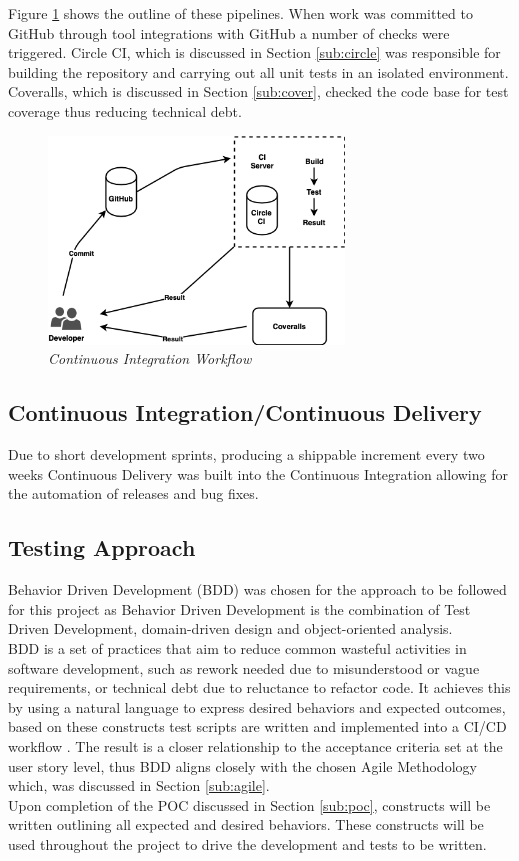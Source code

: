 Figure \ref{img:ci} shows the outline of these pipelines. When work was committed to GitHub through tool integrations with GitHub a number of checks were triggered. Circle CI, which is discussed in Section \ref{sub:circle} was responsible for building the repository and carrying out all unit tests in an isolated environment. Coveralls, which is discussed in Section \ref{sub:cover}, checked the code base for test coverage thus reducing technical debt.
\begin{figure}[!ht]
\centering
\includegraphics*[width=0.7\textwidth]{images/ci-cd.png}
\caption{\em Continuous Integration Workflow}
\label{img:ci}
\end{figure}

\subsection{Continuous Integration/Continuous Delivery}
Due to short development sprints, producing a shippable increment every two weeks Continuous Delivery was built into the Continuous Integration allowing for the automation of releases and bug fixes.

\subsection{Testing Approach}
Behavior Driven Development (BDD) was chosen for the approach to be followed for this project as Behavior Driven Development is the combination of Test Driven Development, domain-driven design and object-oriented analysis. 
\\BDD is a set of practices that aim to reduce common wasteful activities in software development, such as rework needed due to misunderstood or vague requirements, or technical debt due to reluctance to refactor code. It achieves this by using a natural language to express desired behaviors and expected outcomes, based on these constructs test scripts are written and implemented into a CI/CD workflow \citep{solis_wang}. The result is a closer relationship to the acceptance criteria set at the user story level, thus BDD aligns closely with the chosen Agile Methodology which, was discussed in Section \ref{sub:agile}. 
\\Upon completion of the POC discussed in Section \ref{sub:poc}, constructs will be written outlining all expected and desired behaviors. These constructs will be used throughout the project to drive the development and tests to be written.

